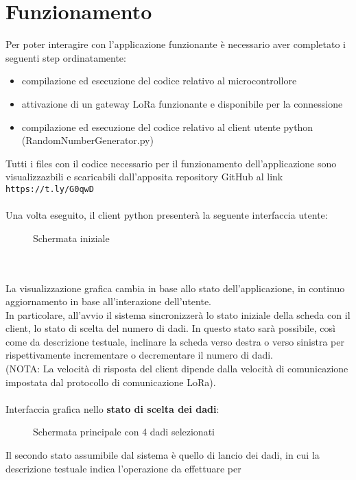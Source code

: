 \section{Funzionamento}
Per poter interagire con l'applicazione funzionante è necessario aver completato i seguenti step ordinatamente:
\begin{itemize}
    \item compilazione ed esecuzione del codice relativo al microcontrollore
    \item attivazione di un gateway LoRa funzionante e disponibile per la connessione
    \item compilazione ed esecuzione del codice relativo al client utente python (RandomNumberGenerator.py)
\end{itemize}
Tutti i files con il codice necessario per il funzionamento dell'applicazione sono visualizzazbili e scaricabili dall'apposita repository GitHub al link \space\space \Verb|https://t.ly/G0qwD|
\\\\Una volta eseguito, il client python presenterà la seguente interfaccia utente:
\begin{figure}[h!]
    \centering
    \caption{Schermata iniziale}
    \label{fig:homepage}
\end{figure}
\\\\La visualizzazione grafica cambia in base allo stato dell'applicazione, in continuo aggiornamento in base all'interazione dell'utente.
\\In particolare, all'avvio il sistema sincronizzerà lo stato iniziale della scheda con il client, lo stato di scelta del numero di dadi.
In questo stato sarà possibile, così come da descrizione testuale, inclinare la scheda verso destra o verso sinistra per rispettivamente
incrementare o decrementare il numero di dadi. 
\\(NOTA: La velocità di risposta del client dipende dalla velocità di comunicazione 
impostata dal protocollo di comunicazione LoRa).
\\\\Interfaccia grafica nello \textbf{stato di scelta dei dadi}:
\begin{figure}[H]
    \centering
    \caption{Schermata principale con 4 dadi selezionati}
    \label{fig:RollStateOFF}
\end{figure}
Il secondo stato assumibile dal sistema è quello di lancio dei dadi, in cui la descrizione testuale indica l'operazione da effettuare per 
